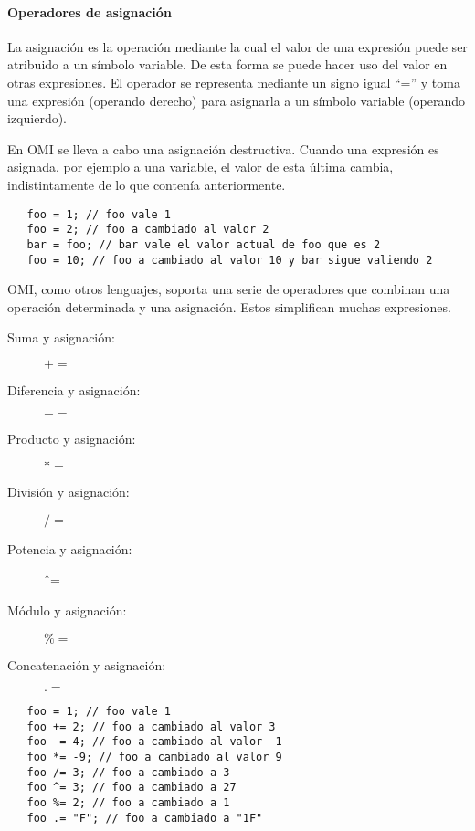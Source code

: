 \paragraph{Operadores de asignación} \label{sec:op_asig}
La asignación es la operación mediante la cual el valor de una expresión puede ser atribuido a un símbolo variable. De esta forma se puede hacer uso 
del valor en otras expresiones. El operador se representa mediante un signo igual ``='' y toma una expresión (operando derecho) para asignarla a un símbolo variable (operando izquierdo).
 

En OMI se lleva a cabo una asignación destructiva. Cuando una expresión es asignada, por ejemplo a una variable, el valor de esta última cambia, indistintamente de lo que contenía
anteriormente.\\

 \begin{lstlisting}
   foo = 1; // foo vale 1
   foo = 2; // foo a cambiado al valor 2
   bar = foo; // bar vale el valor actual de foo que es 2
   foo = 10; // foo a cambiado al valor 10 y bar sigue valiendo 2
\end{lstlisting} 

OMI, como otros lenguajes, soporta una serie de operadores que combinan una operación determinada y una asignación. Estos simplifican
muchas expresiones.

\begin{description}
\item [Suma y asignación:] $+=$
\item [Diferencia y asignación:] $-=$
\item [Producto y asignación:] $*=$
\item [División y asignación:] $/=$
\item [Potencia y asignación:] \^ \ =\hfill 
\item [Módulo y asignación:] $\%=$
\item [Concatenación y asignación:] $.=$
\end{description} 

 \begin{lstlisting}
   foo = 1; // foo vale 1
   foo += 2; // foo a cambiado al valor 3
   foo -= 4; // foo a cambiado al valor -1
   foo *= -9; // foo a cambiado al valor 9
   foo /= 3; // foo a cambiado a 3
   foo ^= 3; // foo a cambiado a 27
   foo %= 2; // foo a cambiado a 1
   foo .= "F"; // foo a cambiado a "1F" 
\end{lstlisting} 


